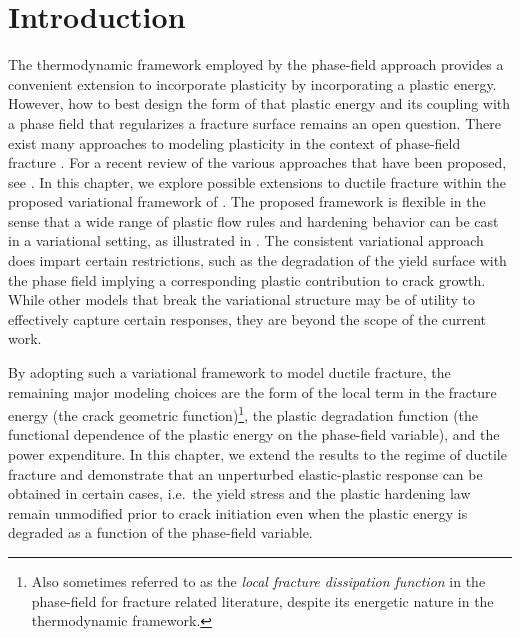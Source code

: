 \section{Introduction}
\label{section: ductile/intro}


The thermodynamic framework employed by the phase-field approach provides a convenient extension to incorporate plasticity by incorporating a plastic energy. However, how to best design the form of that plastic energy and its coupling with a phase field that regularizes a fracture surface remains an open question.
There exist many approaches to modeling plasticity in the context of phase-field fracture \cite{alessi_gradient_2014, alessi_gradient_2015, alessi_coupling_2018, ambati_phase-field_2015, ambati2016phase, miehe_phase_2016, borden2016phase, borden_phase-field_2017}.  For a recent review of the various approaches that have been proposed, see  \citet{alessi_comparison_2017}. In this chapter, we explore possible extensions to ductile fracture within the proposed variational framework of . The proposed framework is flexible in the sense that a wide range of plastic flow rules and hardening behavior can be cast in a variational setting, as illustrated in \cite{ortiz_variational_1999}.  The consistent variational approach does impart certain restrictions, such as the degradation of the yield surface with the phase field implying a corresponding plastic contribution to crack growth.  While other models that break the variational structure may be of utility to effectively capture certain responses, they are beyond the scope of the current work.


By adopting such a variational framework to model ductile fracture, the remaining major modeling choices are the form of the local term in the fracture energy (the crack geometric function)\footnote{Also sometimes referred to as the \textit{local fracture dissipation function} in the phase-field for fracture related literature, despite its energetic nature in the thermodynamic framework.}, the plastic degradation function (the functional dependence of the plastic energy on the phase-field variable), and the power expenditure. In this chapter, we extend the results to the regime of ductile fracture and demonstrate that an unperturbed elastic-plastic response can be obtained in certain cases, i.e.\ the yield stress and the plastic hardening law remain unmodified prior to crack initiation even when the plastic energy is degraded as a function of the phase-field variable.

